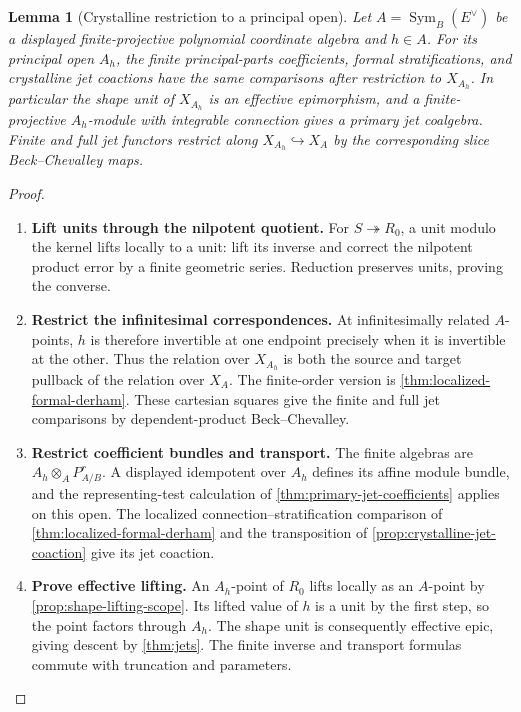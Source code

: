 \documentclass[11pt,a4paper]{article}
\numberwithin{algorithm}{section}
\numberwithin{equation}{section}
\newtheorem{lemma}[lemma]{Lemma}
\theoremstyle{definition}
\theoremstyle{remark}
\theoremstyle{plain}
\newcommand{\incl}{\hookrightarrow}
\newcommand{\onto}{\twoheadrightarrow}
\newcommand{\Sym}{\operatorname{Sym}}
\theoremstyle{definition}
\theoremstyle{plain}
\begin{document}
\begin{lemma}[Crystalline restriction to a principal open]
\label{lem:principal-open-jets}
Let $A=\Sym_B(E^\vee)$ be a displayed finite-projective polynomial
coordinate algebra and $h\in A$. For its principal open $A_h$, the
finite principal-parts coefficients, formal stratifications, and
crystalline jet coactions have the same comparisons after restriction
to $X_{A_h}$. In particular the shape unit of $X_{A_h}$ is an effective
epimorphism, and a finite-projective $A_h$-module with integrable
connection gives a primary jet coalgebra. Finite and full jet functors
restrict along $X_{A_h}\incl X_A$ by the corresponding slice
Beck--Chevalley maps.
\end{lemma}
\begin{proof}\leavevmode
\begin{enumerate}[leftmargin=*,align=left]
\item \textbf{Lift units through the nilpotent quotient.}
For $S\onto R_0$, a unit modulo the kernel lifts locally to a
unit: lift its inverse and correct the nilpotent product error by
a finite geometric series. Reduction preserves units, proving
the converse.

\item \textbf{Restrict the infinitesimal correspondences.}
At infinitesimally related $A$-points, $h$ is therefore invertible
at one endpoint precisely when it is invertible at the other.
Thus the relation over $X_{A_h}$ is both the source and target
pullback of the relation over $X_A$. The finite-order version is
\cref{thm:localized-formal-derham}. These cartesian squares give
the finite and full jet comparisons by dependent-product
Beck--Chevalley.

\item \textbf{Restrict coefficient bundles and transport.}
The finite algebras are $A_h\otimes_AP^r_{A/B}$.
A displayed idempotent over $A_h$ defines its affine module bundle,
and the representing-test calculation of
\cref{thm:primary-jet-coefficients} applies on this open.
The localized connection--stratification comparison of
\cref{thm:localized-formal-derham} and the transposition of
\cref{prop:crystalline-jet-coaction} give its jet coaction.

\item \textbf{Prove effective lifting.}
An $A_h$-point of $R_0$ lifts locally as an $A$-point by
\cref{prop:shape-lifting-scope}. Its lifted value of $h$ is a
unit by the first step, so the point factors through $A_h$.
The shape unit is consequently effective epic, giving descent
by \cref{thm:jets}. The finite inverse and transport formulas
commute with truncation and parameters.
\end{enumerate}
\end{proof}
\end{document}
